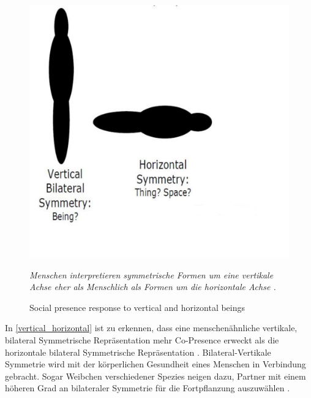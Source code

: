 \documentclass[a4paper,11pt]{article}%
\renewcommand{\\}{\vspace*{0.5\baselineskip} \newline}
\begin{document}
	\begin{figure}[b!]
		\begin{footnotesize}
		\centering
			\includegraphics[scale= 0.3]{Abbildungen/Symmetry.JPG}
			\caption[Abbildung 1]{Social presence response to vertical and
horizontal beings}
			\textit{Menschen interpretieren symmetrische Formen um eine vertikale Achse eher als \dq{}Menschlich\dq{} als Formen um die horizontale Achse \citep{biocca2002defining}. }
			\label{vertical_horizontal}
		\end{footnotesize}
	\end{figure}

In \autoref{vertical_horizontal} ist zu erkennen, dass eine menschenähnliche vertikale, bilateral Symmetrische Repräsentation mehr \dq{}Co-Presence\dq{} erweckt als die horizontale bilateral Symmetrische Repräsentation \citep[p.546-551]{thornhill1998relative}.
Bilateral-Vertikale Symmetrie wird mit der körperlichen Gesundheit eines Menschen in Verbindung gebracht. Sogar Weibchen verschiedener Spezies neigen dazu, Partner mit einem höheren Grad an bilateraler Symmetrie für die Fortpflanzung auszuwählen \citep[p. 659–669]{rhodes1998facial} \citep{biocca2002defining} \citep[p.233–242]{grammer1994human}.
\end{document}

